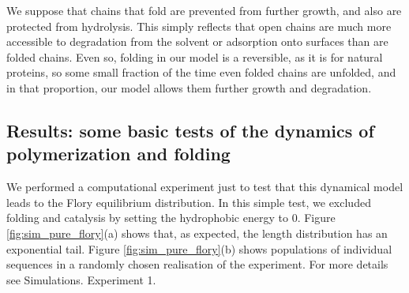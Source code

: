 \documentclass[journal=jacsat,manuscript=article,layout=twocolumn]{achemso}
\begin{document}
We suppose that chains that fold are prevented from further growth, and also are protected from 
hydrolysis.  This simply reflects that open chains are much more accessible to degradation from 
the 
solvent or adsorption onto surfaces than are folded chains.  Even so, folding in our model is a 
reversible, as it is for natural proteins, so some small fraction of the time even 
folded chains are unfolded, and in that proportion, our model allows them further growth and 
degradation.
 



\subsection{Results: some basic tests of the dynamics of polymerization and folding}

 We performed a computational experiment just to test that this dynamical model leads to the 
 Flory equilibrium distribution.  In this simple test, we excluded folding and catalysis by 
setting 
the hydrophobic energy to $0$. Figure \ref{fig:sim_pure_flory}(a) shows that, as expected, the 
length 
distribution has an exponential tail. Figure \ref{fig:sim_pure_flory}(b) shows populations of 
individual sequences in a randomly chosen realisation of the experiment. For more details see 
Simulations. Experiment 1.
\end{document}
